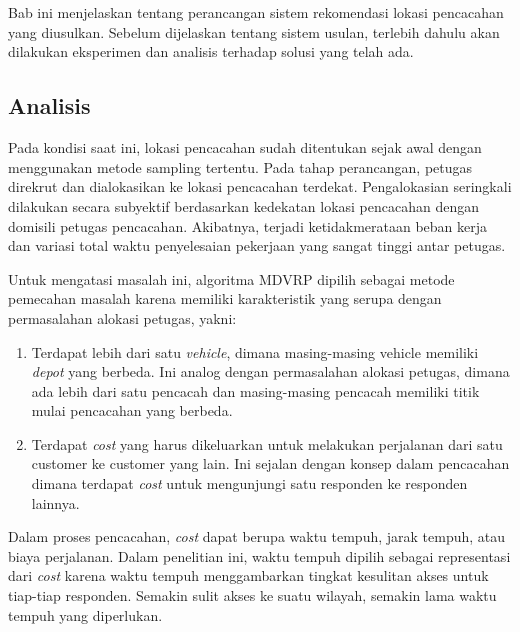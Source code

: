 \chapter{\babEmpat}


Bab ini menjelaskan tentang perancangan sistem rekomendasi lokasi pencacahan yang diusulkan. Sebelum dijelaskan tentang sistem usulan, terlebih dahulu akan dilakukan eksperimen dan analisis terhadap solusi yang telah ada.


\section{Analisis}
\label{sec:analysis}
Pada kondisi saat ini, lokasi pencacahan sudah ditentukan sejak awal dengan menggunakan metode sampling tertentu. Pada tahap perancangan, petugas direkrut dan dialokasikan ke lokasi pencacahan terdekat. Pengalokasian seringkali dilakukan secara subyektif berdasarkan kedekatan lokasi pencacahan dengan domisili petugas pencacahan. Akibatnya, terjadi ketidakmerataan beban kerja dan variasi total waktu penyelesaian pekerjaan yang sangat tinggi antar petugas. 

Untuk mengatasi masalah ini, algoritma MDVRP dipilih sebagai metode pemecahan masalah karena memiliki karakteristik yang serupa dengan permasalahan alokasi petugas, yakni: 

\begin{enumerate}
	\item Terdapat lebih dari satu \textit{vehicle}, dimana masing-masing vehicle memiliki \textit{depot} yang berbeda. Ini analog dengan permasalahan alokasi petugas, dimana ada lebih dari satu pencacah dan masing-masing pencacah memiliki titik mulai pencacahan yang berbeda. 
	\item Terdapat \textit{cost} yang harus dikeluarkan untuk melakukan perjalanan dari satu customer ke customer yang lain. Ini sejalan dengan konsep dalam pencacahan dimana terdapat \textit{cost} untuk mengunjungi satu responden ke responden lainnya. 
\end{enumerate}

Dalam proses pencacahan, \textit{cost} dapat berupa waktu tempuh, jarak tempuh, atau biaya perjalanan. Dalam penelitian ini, waktu tempuh dipilih sebagai representasi dari \textit{cost} karena waktu tempuh menggambarkan tingkat kesulitan akses untuk tiap-tiap responden. Semakin sulit akses ke suatu wilayah, semakin lama waktu tempuh yang diperlukan. 

